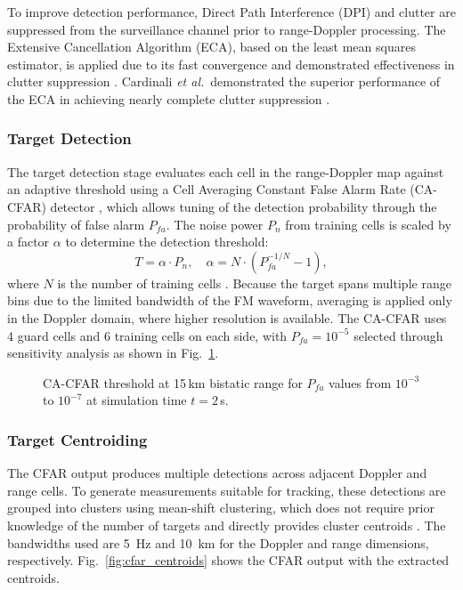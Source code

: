 \documentclass[conference]{IEEEtran}
\begin{document}
To improve detection performance, Direct Path Interference (DPI) and clutter are suppressed from the surveillance channel prior to range-Doppler processing. The Extensive Cancellation Algorithm (ECA), based on the least mean squares estimator, is applied due to its fast convergence and demonstrated effectiveness in clutter suppression \cite{coloneECA}. Cardinali \textit{et al.}\ demonstrated the superior performance of the ECA in achieving nearly complete clutter suppression \cite{cardinali2007comparison, Heunis2010}.

\subsubsection{Target Detection}

The target detection stage evaluates each cell in the range-Doppler map against an adaptive threshold using a Cell Averaging Constant False Alarm Rate (CA-CFAR) detector \cite{Shrivathsa2008a}, which allows tuning of the detection probability through the probability of false alarm $P_{fa}$. The noise power $P_n$ from training cells is scaled by a factor $\alpha$ to determine the detection threshold:
\begin{equation}
  T = \alpha \cdot P_n, \quad \alpha = N \cdot (P_{fa}^{-1/N} - 1),
\end{equation}
where $N$ is the number of training cells \cite{Sambath2020a}. Because the target spans multiple range bins due to the limited bandwidth of the FM waveform, averaging is applied only in the Doppler domain, where higher resolution is available. The CA-CFAR uses 4 guard cells and 6 training cells on each side, with $P_{fa} = 10^{-5}$ selected through sensitivity analysis as shown in Fig.~\ref{fig:cfarValidation}.

\begin{figure}[t]
  \centering
  
  \caption{CA-CFAR threshold at 15\,km bistatic range for $P_{fa}$ values from $10^{-3}$ to $10^{-7}$ at simulation time $t = 2$\,s.}
  \label{fig:cfarValidation}
\end{figure}

\subsubsection{Target Centroiding}

The CFAR output produces multiple detections across adjacent Doppler and range cells. To generate measurements suitable for tracking, these detections are grouped into clusters using mean-shift clustering, which does not require prior knowledge of the number of targets and directly provides cluster centroids \cite{cheng1995mean, derpanis2005mean}. The bandwidths used are 5~Hz and 10~km for the Doppler and range dimensions, respectively. Fig.~\ref{fig:cfar_centroids} shows the CFAR output with the extracted centroids.
\end{document}
